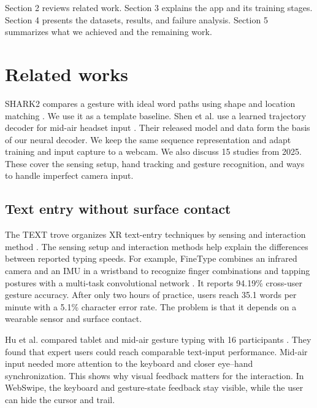 \documentclass[preprint,12pt]{elsarticle}
\begin{document}
Section 2 reviews related work. Section 3 explains the app and its training stages. Section 4 presents the datasets, results, and failure analysis. Section 5 summarizes what we achieved and the remaining work.

\section{Related works}\label{section2}
SHARK2 compares a gesture with ideal word paths using shape and location matching \cite{shark2}. We use it as a template baseline. Shen et al. use a learned trajectory decoder for mid-air headset input \cite{shen2023}. Their released model and data form the basis of our neural decoder. We keep the same sequence representation and adapt training and input capture to a webcam. We also discuss 15 studies from 2025. These cover the sensing setup, hand tracking and gesture recognition, and ways to handle imperfect camera input.

\subsection{Text entry without surface contact}
The TEXT trove organizes XR text-entry techniques by sensing and interaction method \cite{recent01}. The sensing setup and interaction methods help explain the differences between reported typing speeds. For example, FineType combines an infrared camera and an IMU in a wristband to recognize finger combinations and tapping postures with a multi-task convolutional network \cite{recent03}. It reports 94.19\% cross-user gesture accuracy. After only two hours of practice, users reach 35.1 words per minute with a 5.1\% character error rate. The problem is that it depends on a wearable sensor and surface contact.

Hu et al. compared tablet and mid-air gesture typing with 16 participants \cite{recent02}. They found that expert users could reach comparable text-input performance. Mid-air input needed more attention to the keyboard and closer eye--hand synchronization. This shows why visual feedback matters for the interaction. In WebSwipe, the keyboard and gesture-state feedback stay visible, while the user can hide the cursor and trail.
\end{document}
